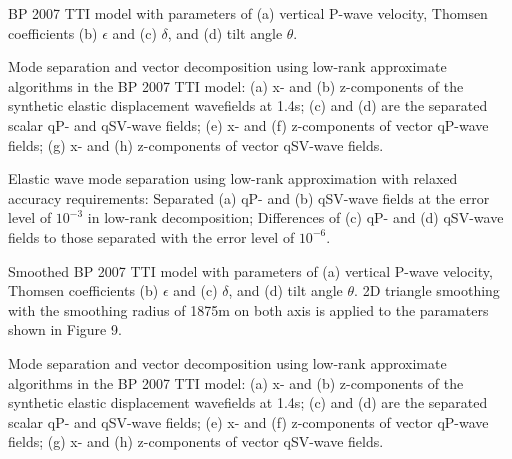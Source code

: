 {
BP 2007 TTI model with parameters of (a) vertical P-wave velocity, Thomsen coefficients
(b) $\epsilon$ and (c) $\delta$, and (d) tilt angle $\theta$.
}

{
Mode separation and vector decomposition using low-rank approximate algorithms in the BP 2007 TTI model:
(a) x- and (b) z-components of the synthetic elastic displacement wavefields at 1.4s;
(c) and (d) are the separated scalar qP- and qSV-wave fields;
(e) x- and (f) z-components of vector qP-wave fields;
(g) x- and (h) z-components of vector qSV-wave fields.
}


{
Elastic wave mode separation using low-rank approximation with relaxed accuracy requirements:
Separated (a) qP- and (b) qSV-wave fields at the error level of $10^{-3}$ in low-rank decomposition;
Differences of (c) qP- and (d) qSV-wave fields to those separated with the error level of $10^{-6}$.
}


{
Smoothed BP 2007 TTI model with parameters of (a) vertical P-wave velocity, Thomsen coefficients
(b) $\epsilon$ and (c) $\delta$, and (d) tilt angle $\theta$. 2D triangle smoothing with the smoothing radius
of 1875m on both axis is applied to the paramaters shown in Figure 9.
}

{
Mode separation and vector decomposition using low-rank approximate algorithms in the BP 2007 TTI model:
(a) x- and (b) z-components of the synthetic elastic displacement wavefields at 1.4s;
(c) and (d) are the separated scalar qP- and qSV-wave fields;
(e) x- and (f) z-components of vector qP-wave fields;
(g) x- and (h) z-components of vector qSV-wave fields.
}
